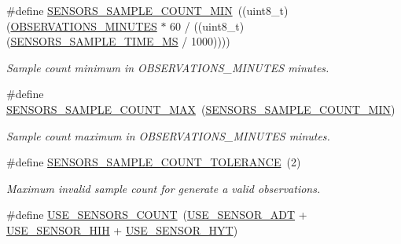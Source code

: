 \begin{DoxyCompactItemize}
\#define \hyperlink{i2c-th-config_8h_a05567a696548b4a2e03c49dc893a32c8}{S\+E\+N\+S\+O\+R\+S\+\_\+\+S\+A\+M\+P\+L\+E\+\_\+\+C\+O\+U\+N\+T\+\_\+\+M\+IN}~((uint8\+\_\+t)(\hyperlink{sensors__config_8h_acd6a77ef70e6cd768267a4e3d79cf981}{O\+B\+S\+E\+R\+V\+A\+T\+I\+O\+N\+S\+\_\+\+M\+I\+N\+U\+T\+ES} $\ast$ 60 / ((uint8\+\_\+t)(\hyperlink{i2c-th-config_8h_a94909b75c6bbb3614c483f1d22462440}{S\+E\+N\+S\+O\+R\+S\+\_\+\+S\+A\+M\+P\+L\+E\+\_\+\+T\+I\+M\+E\+\_\+\+MS} / 1000))))
\begin{DoxyCompactList}\small\item\em Sample count minimum in O\+B\+S\+E\+R\+V\+A\+T\+I\+O\+N\+S\+\_\+\+M\+I\+N\+U\+T\+ES minutes. \end{DoxyCompactList}\item 
\mbox{\label{i2c-th-config_8h_a5500c7c28f9fc2cab4deffbe07c98b39}} 
\#define \hyperlink{i2c-th-config_8h_a5500c7c28f9fc2cab4deffbe07c98b39}{S\+E\+N\+S\+O\+R\+S\+\_\+\+S\+A\+M\+P\+L\+E\+\_\+\+C\+O\+U\+N\+T\+\_\+\+M\+AX}~(\hyperlink{i2c-th-config_8h_a05567a696548b4a2e03c49dc893a32c8}{S\+E\+N\+S\+O\+R\+S\+\_\+\+S\+A\+M\+P\+L\+E\+\_\+\+C\+O\+U\+N\+T\+\_\+\+M\+IN})
\begin{DoxyCompactList}\small\item\em Sample count maximum in O\+B\+S\+E\+R\+V\+A\+T\+I\+O\+N\+S\+\_\+\+M\+I\+N\+U\+T\+ES minutes. \end{DoxyCompactList}\item 
\mbox{\label{i2c-th-config_8h_a4ee69ccbdc607eb03834e7cf1d950ec0}} 
\#define \hyperlink{i2c-th-config_8h_a4ee69ccbdc607eb03834e7cf1d950ec0}{S\+E\+N\+S\+O\+R\+S\+\_\+\+S\+A\+M\+P\+L\+E\+\_\+\+C\+O\+U\+N\+T\+\_\+\+T\+O\+L\+E\+R\+A\+N\+CE}~(2)
\begin{DoxyCompactList}\small\item\em Maximum invalid sample count for generate a valid observations. \end{DoxyCompactList}\item 
\mbox{\label{i2c-th-config_8h_af18dc3de744722cb308451b7a705611b}} 
\#define \hyperlink{i2c-th-config_8h_af18dc3de744722cb308451b7a705611b}{U\+S\+E\+\_\+\+S\+E\+N\+S\+O\+R\+S\+\_\+\+C\+O\+U\+NT}~(\hyperlink{sensors__config_8h_a34acfad25488d28951ff729ebda66311}{U\+S\+E\+\_\+\+S\+E\+N\+S\+O\+R\+\_\+\+A\+DT} + \hyperlink{sensors__config_8h_aa1d83db2373ab5e74ed832abf1b7f0ed}{U\+S\+E\+\_\+\+S\+E\+N\+S\+O\+R\+\_\+\+H\+IH} + \hyperlink{sensors__config_8h_a85f2976107ff26789b268febf87a392a}{U\+S\+E\+\_\+\+S\+E\+N\+S\+O\+R\+\_\+\+H\+YT})

\end{DoxyCompactItemize}
